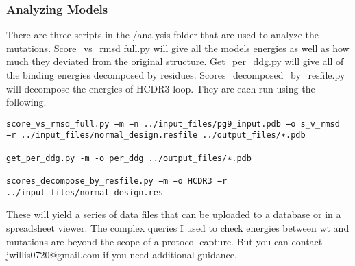 \subsubsection{Analyzing Models}
There are three scripts in the /analysis folder that are used to analyze the mutations. Score\_vs\_rmsd full.py will give all the models energies as well as how much they deviated from the original structure. Get\_per\_ddg.py will give all of the binding energies decomposed by residues. Scores\_decomposed\_by\_resfile.py will decompose the energies of HCDR3 loop. They are each run using the following.

\begin{lstlisting}[breaklines=true]
score_vs_rmsd_full.py −m −n ../input_files/pg9_input.pdb −o s_v_rmsd −r ../input_files/normal_design.resfile ../output_files/∗.pdb

get_per_ddg.py -m -o per_ddg ../output_files/∗.pdb

scores_decompose_by_resfile.py −m −o HCDR3 −r ../input_files/normal_design.res
\end{lstlisting}

These will yield a series of data files that can be uploaded to a database or in a spreadsheet viewer. The complex queries I used to check energies between wt and mutations are beyond the scope of a protocol capture. But you can contact jwillis0720@gmail.com if you need additional guidance.



